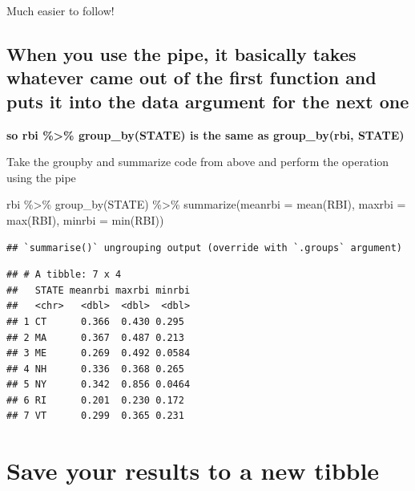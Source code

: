 \documentclass[
]{book}
\newenvironment{Shaded}{\begin{snugshade}}{\end{snugshade}}
\newcommand{\AttributeTok}[1]{\textcolor[rgb]{0.77,0.63,0.00}{#1}}
\newcommand{\FunctionTok}[1]{\textcolor[rgb]{0.00,0.00,0.00}{#1}}
\newcommand{\NormalTok}[1]{#1}
\newcommand{\SpecialCharTok}[1]{\textcolor[rgb]{0.00,0.00,0.00}{#1}}
\begin{document}
Much easier to follow!

\hypertarget{when-you-use-the-pipe-it-basically-takes-whatever-came-out-of-the-first-function-and-puts-it-into-the-data-argument-for-the-next-one}{%
\subsection{When you use the pipe, it basically takes whatever came out of the first function and puts it into the data argument for the next one}\label{when-you-use-the-pipe-it-basically-takes-whatever-came-out-of-the-first-function-and-puts-it-into-the-data-argument-for-the-next-one}}

\textbf{so rbi \%\textgreater\% group\_by(STATE) is the same as group\_by(rbi, STATE)}

Take the groupby and summarize code from above and perform the operation using the pipe

\begin{Shaded}
\begin{Highlighting}[]
\NormalTok{rbi }\SpecialCharTok{\%\textgreater{}\%}
  \FunctionTok{group\_by}\NormalTok{(STATE) }\SpecialCharTok{\%\textgreater{}\%}
  \FunctionTok{summarize}\NormalTok{(}\AttributeTok{meanrbi =} \FunctionTok{mean}\NormalTok{(RBI), }\AttributeTok{maxrbi =} \FunctionTok{max}\NormalTok{(RBI), }\AttributeTok{minrbi =} \FunctionTok{min}\NormalTok{(RBI))}
\end{Highlighting}
\end{Shaded}

\begin{verbatim}
## `summarise()` ungrouping output (override with `.groups` argument)
\end{verbatim}

\begin{verbatim}
## # A tibble: 7 x 4
##   STATE meanrbi maxrbi minrbi
##   <chr>   <dbl>  <dbl>  <dbl>
## 1 CT      0.366  0.430 0.295 
## 2 MA      0.367  0.487 0.213 
## 3 ME      0.269  0.492 0.0584
## 4 NH      0.336  0.368 0.265 
## 5 NY      0.342  0.856 0.0464
## 6 RI      0.201  0.230 0.172 
## 7 VT      0.299  0.365 0.231
\end{verbatim}

\hypertarget{save-your-results-to-a-new-tibble}{%
\section{Save your results to a new tibble}\label{save-your-results-to-a-new-tibble}}
\end{document}
